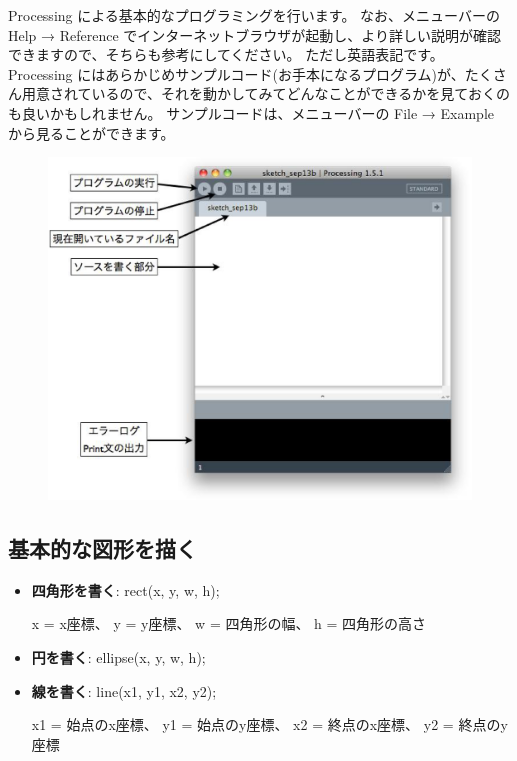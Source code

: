\documentclass[11pt,a4paper]{jarticle}
\begin{document}
Processing による基本的なプログラミングを行います。
なお、メニューバーの Help → Reference でインターネットブラウザが起動し、より詳しい説明が確認できますので、そちらも参考にしてください。
ただし英語表記です。
Processing にはあらかじめサンプルコード(お手本になるプログラム)が、たくさん用意されているので、それを動かしてみてどんなことができるかを見ておくのも良いかもしれません。
サンプルコードは、メニューバーの File → Example から見ることができます。

\begin{figure}[h!]
 \centering
 \includegraphics[width=0.5\columnwidth]{img/processing_ide.eps}
\end{figure}


\subsection*{基本的な図形を描く}

\begin{itemize}
 \item \textbf{四角形を書く}: rect(x, y, w, h);

       x = x座標、
       y = y座標、
       w = 四角形の幅、
       h = 四角形の高さ

 \item \textbf{円を書く}: ellipse(x, y, w, h);
 \item \textbf{線を書く}: line(x1, y1, x2, y2);
       
       x1 = 始点のx座標、
       y1 = 始点のy座標、
       x2 = 終点のx座標、
       y2 = 終点のy座標

\end{itemize}
\end{document}
